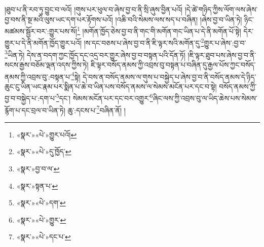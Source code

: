 །ཐུབ་པ་ནི་རབ་ཏུ་བྱུང་བ་ལའོ། །གུས་པར་ཕུལ་བ་ཞེས་བྱ་བ་ནི་སྲི་ཞུས་བྱིན་པའོ། །དེ་ཚེ་གཉིད་ཀྱིས་ལོག་ལས་ཞེས་བྱ་བས་ནི་སྔ་མའི་ལུས་ཡང་དག་པར་རྟོགས་པའོ། །འཆི་བའི་སེམས་ལས་སད་པ་བཞིན། །ཞེས་བྱ་བ་ཡིན་ཏེ། ཉིང་མཚམས་སྦྱོར་བར་:གྱུར་པས་སོ།\footnote{«སྣར་»«པེ་»གྱུར་པའོ།} །མགོན་ཁྱོད་ཅེས་བྱ་བ་ནི་གང་གི་མགོན་གང་ཡིན་པ་དེ་ནི་མགོན་པོ་སྟེ། དེར་གྱུར་པ་དེ་ནི་མགོན་ཁྱོད་གྱུར་པའོ། །ས་དང་བཅས་པ་ཞེས་བྱ་བ་ནི་ཇི་ལྟར་སའི་མགོན་དུ་\footnote{«སྣར་»«པེ་»དུ་ཁྱོད་}གྱུར་པ་ཞེས་:བྱ་བ་\footnote{«སྣར་»བྱ་བ་ལ་}ཡིན་ཏེ། དེས་ན་བདག་ཀྱང་ཁྱོད་དང་འདྲ་བར་གྱུར་ཞེས་བྱ་བ་བསྟན་པའི་དོན་ཏོ། །ཇི་ལྟར་ཐུབ་པས་ཞེས་བྱ་བ་ནི་སངས་རྒྱས་བཅོམ་ལྡན་འདས་ཀྱིས་ཏེ། ཇི་ལྟར་བསོད་ནམས་ཀྱི་འབྲས་བུ་བསྟན་པ་བཞིན་དུ་རྒྱལ་པོས་ཀྱང་བསོད་ནམས་ཀྱི་འབྲས་བུ་:བསྟན་པ་\footnote{«སྣར་»སྟན་པ་}སྟེ། དེ་བས་ན་བསོད་ནམས་ལ་གུས་པ་བསྐྱེད་པ་ཞེས་བྱ་བ་ནི་བསོད་ནམས་དེ་ཉིད་ཆུང་ངུ་ཡིན་ཡང་རྣམ་པར་སྨིན་པ་ཆེ་བ་ཡིན་པས་བསོད་ནམས་ལ་སེམས་མངོན་པར་དང་བ་སྟེ། བསོད་ནམས་ཀྱི་བྱ་བ་བསྐྱེད་པ་:དག་པ་\footnote{«སྣར་»«པེ་»དག་}དང་། སེམས་མངོན་པར་དང་བར་འགྱུར་\footnote{«སྣར་»«པེ་»གྱུར་}ཞིང་ལས་ཀྱི་འབྲས་བུ་ལ་ཡིད་ཆེས་པས་སེམས་རྙོག་པ་དང་བྲལ་བ་ཡིན་ཏེ། ཆུ་:དངས་པ་\footnote{«སྣར་»«པེ་»དང་པ་}བཞིན་ནོ། །
